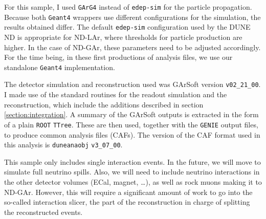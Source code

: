 For this sample, I used \texttt{GArG4} instead of \texttt{edep-sim} for the particle propagation. Because both \texttt{Geant4} wrappers use different configurations for the simulation, the results obtained differ. The default \texttt{edep-sim} configuration used by the DUNE ND is appropriate for ND-LAr, where thresholds for particle production are higher. In the case of ND-GAr, these parameters need to be adjusted accordingly. For the time being, in these first productions of analysis files, we use our standalone \texttt{Geant4} implementation.

The detector simulation and reconstruction used was GArSoft version \texttt{v02_21_00}. I made use of the standard routines for the readout simulation and the reconstruction, which include the additions described in section \ref{section:integration}. A summary of the GArSoft outputs is extracted in the form of a plain \texttt{ROOT} \texttt{TTree}. These are then used, together with the \texttt{GENIE} output files, to produce common analysis files (CAFs). The version of the CAF format used in this analysis is \texttt{duneanaobj} \texttt{v3_07_00}.

This sample only includes single interaction events. In the future, we will move to simulate full neutrino spills. Also, we will need to include neutrino interactions in the other detector volumes (ECal, magnet, \dots), as well as rock muons making it to ND-GAr. However, this will require a significant amount of work to go into the so-called interaction slicer, the part of the reconstruction in charge of splitting the reconstructed events.

